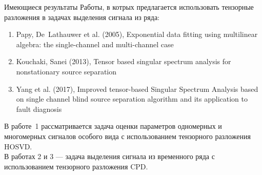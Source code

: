 \documentclass[ucs, notheorems, handout]{beamer}
\begin{document}
    \begin{frame}{Имеющиеся результаты}
        Работы, в котрых предлагается использовать тензорные разложения в задачах
        выделения сигнала из ряда:
        \begin{enumerate}
            \item Papy, De~Lathauwer et al. (2005), Exponential data fitting using
            multilinear algebra: the single-channel and multi-channel case
            \item Kouchaki, Sanei (2013), Tensor based singular spectrum analysis for
            nonstationary source separation
            \item Yang et al. (2017), Improved tensor-based Singular Spectrum Analysis
            based on single channel blind source separation algorithm and its application
            to fault diagnosis
        \end{enumerate}
        \vspace{0.2cm}
        
        В работе~1 рассматривается задача оценки параметров одномерных и многомерных
        сигналов особого вида с использованием тензорного разложения HOSVD.\\
        В работах 2 и 3 --- задача выделения сигнала из временного ряда с использованием
        тензорного разложения CPD.
    \end{frame}
    
\end{document}
